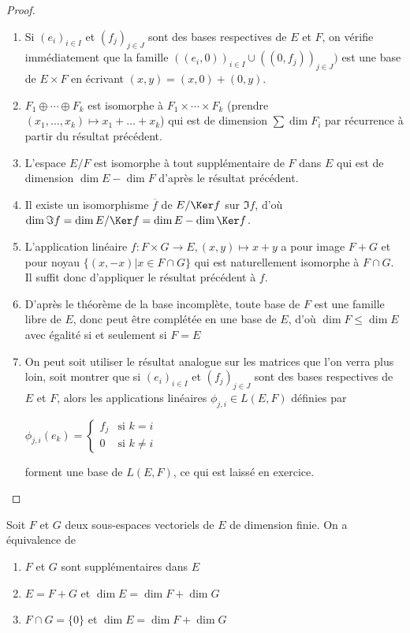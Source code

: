 \begin{proof}
\begin{enumerate}
\item Si $(e_i)_{i\in I}$ et $(f_j)_{j\in J}$ sont des bases respectives de $E$ et $F$, on vérifie immédiatement que la famille $\left((e_i,0)\right)_{i\in I} \cup \left((0,f_j)\right)_{j\in J})$ est une base de $E \times F$ en écrivant $(x,y) = (x,0) + (0,y)$.
\item $F_1 \oplus \cdots \oplus F_k$ est isomorphe à $F_1 \times \cdots \times F_k$ (prendre $(x_1,\ldots,x_k) \mapsto x_1 + \ldots + x_k$) qui est de dimension $\sum \dim F_i$ par récurrence à partir du résultat précédent.
\item L'espace $E/F$ est isomorphe à tout supplémentaire de $F$ dans $E$ qui est de dimension $\dim E - \dim F$ d'après le résultat précédent.
\item Il existe un isomorphisme $\overline{f}$ de $E/\Ker f$ sur $\Im f$, d'où $\dim \Im f = \dim E/\Ker f = \dim E - \dim \Ker f$.
\item L'application linéaire $f : F \times G \rightarrow E, (x,y) \mapsto x + y$ a pour image $F + G$ et pour noyau $\{(x,-x) | x \in F \cap G\}$ qui est naturellement isomorphe à $F \cap G$. Il suffit donc d'appliquer le résultat précédent à $f$.
\item D'après le théorème de la base incomplète, toute base de $F$ est une famille libre de $E$, donc peut être complétée en une base de $E$, d'où $\dim F \leq \dim E$ avec égalité si et seulement si $F = E$
\item On peut soit utiliser le résultat analogue sur les matrices que l'on verra plus loin, soit montrer que si $(e_i)_{i\in I}$ et $(f_j)_{j\in J}$ sont des bases respectives de $E$ et $F$, alors les applications linéaires $\phi_{j,i} \in L(E,F)$ définies par

$\phi_{j,i}(e_k) = \begin{cases} f_j & \text{si } k = i \\ 0 & \text{si } k \neq i \end{cases}$

forment une base de $L(E,F)$, ce qui est laissé en exercice.
\end{enumerate}
\end{proof}

\begin{thm}
Soit $F$ et $G$ deux sous-espaces vectoriels de $E$ de dimension finie. On a équivalence de 
\begin{enumerate}
\item $F$ et $G$ sont supplémentaires dans $E$ 
\item $E = F + G$ et $\dim E = \dim F + \dim G$
\item $F \cap G = \{0\}$ et $\dim E = \dim F + \dim G$
\end{enumerate}
\end{thm}

